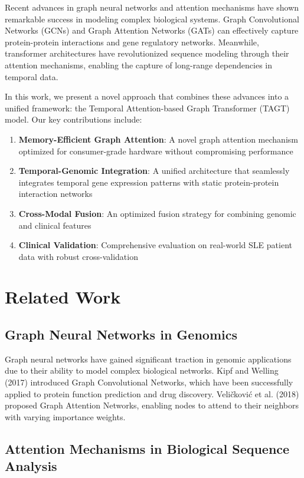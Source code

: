 \documentclass[10pt,twocolumn]{article}
\begin{document}
Recent advances in graph neural networks and attention mechanisms have shown remarkable success in modeling complex biological systems. Graph Convolutional Networks (GCNs) and Graph Attention Networks (GATs) can effectively capture protein-protein interactions and gene regulatory networks. Meanwhile, transformer architectures have revolutionized sequence modeling through their attention mechanisms, enabling the capture of long-range dependencies in temporal data.

In this work, we present a novel approach that combines these advances into a unified framework: the Temporal Attention-based Graph Transformer (TAGT) model. Our key contributions include:

\begin{enumerate}
\item \textbf{Memory-Efficient Graph Attention}: A novel graph attention mechanism optimized for consumer-grade hardware without compromising performance
\item \textbf{Temporal-Genomic Integration}: A unified architecture that seamlessly integrates temporal gene expression patterns with static protein-protein interaction networks
\item \textbf{Cross-Modal Fusion}: An optimized fusion strategy for combining genomic and clinical features
\item \textbf{Clinical Validation}: Comprehensive evaluation on real-world SLE patient data with robust cross-validation
\end{enumerate}

\section{Related Work}

\subsection{Graph Neural Networks in Genomics}

Graph neural networks have gained significant traction in genomic applications due to their ability to model complex biological networks. Kipf and Welling (2017) introduced Graph Convolutional Networks, which have been successfully applied to protein function prediction and drug discovery. Veličković et al. (2018) proposed Graph Attention Networks, enabling nodes to attend to their neighbors with varying importance weights.

\subsection{Attention Mechanisms in Biological Sequence Analysis}
\end{document}
